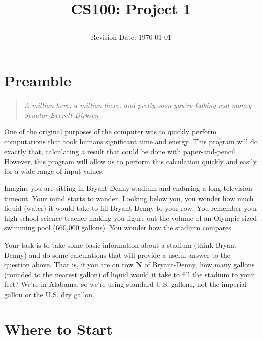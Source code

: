 \documentclass[12pt]{article}
\title{CS100: Project 1\\
\date{Revision Date: \today}}
\begin{document}
\maketitle

\thispagestyle{empty}

\W\subsubsection*{}
\W\htmlrule


\section*{Preamble}

\begin{quote}
{\it A million here, a million there, and pretty soon you're talking real money -- Senator Everett Dirksen}
\end{quote}


One of the original purposes of the computer was to quickly perform
computations that took humans significant time and energy.
This program will do exactly that, calculating a result that could be
done with paper-and-pencil.  However, this program will allow us to
perform this calculation quickly and easily for a wide range of input values.

Imagine you are sitting in Bryant-Denny stadium and enduring a long television
timeout.  Your mind starts to wander.  Looking below you, you wonder how much
liquid (water) it would take to fill Bryant-Denny to your row.
You remember your high school science teacher making you figure out the volume of
an Olympic-sized swimming pool (660,000 gallons).  You wonder how the stadium compares.

Your task is to take some basic information about a stadium (think Bryant-Denny)
and do some calculations that will provide a useful answer to the question above.
That is, if you are on row {\bf N} of Bryant-Denny,
how many gallons (rounded to the nearest gallon)
of liquid would it take to fill the stadium to your feet?
We're in Alabama, so we're using standard U.S. gallons, not the imperial gallon or
the U.S. dry gallon.

\section*{Where to Start}
\end{document}
